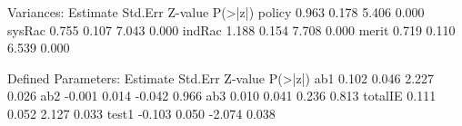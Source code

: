 \begin{Schunk}
\begin{Soutput}
Variances:
                   Estimate  Std.Err  Z-value  P(>|z|)
    policy            0.963    0.178    5.406    0.000
    sysRac            0.755    0.107    7.043    0.000
    indRac            1.188    0.154    7.708    0.000
    merit             0.719    0.110    6.539    0.000

Defined Parameters:
                   Estimate  Std.Err  Z-value  P(>|z|)
    ab1               0.102    0.046    2.227    0.026
    ab2              -0.001    0.014   -0.042    0.966
    ab3               0.010    0.041    0.236    0.813
    totalIE           0.111    0.052    2.127    0.033
    test1            -0.103    0.050   -2.074    0.038
\end{Soutput}
\end{Schunk}

